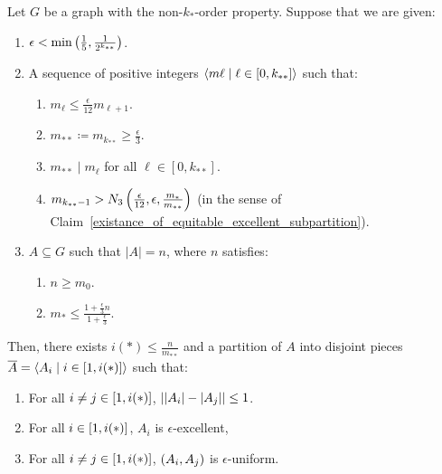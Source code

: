     \lemma[Corollary 5.15]\label{resume_of_all_conditions_for_excellent_partitions}
        Let $G$ be a graph with the non-$k_{*}$-order property.
        Suppose that we are given:
        \begin{enumerate}
            \item $\epsilon < \min \left( \frac{1}{5}, \frac{1}{2^{k_{**}}} \right)$.
            \item A sequence of positive integers $\left< m\ell \mid \ell \in [0, k_{**}] \right>$ such that:
            \begin{enumerate}[label=(\alph*), ref=2.\alph*]
                \item \label{itm:5.15.a} $m_\ell \leq \frac{\epsilon}{12} m_{\ell + 1}$.
                \item \label{itm:5.15.b} $m_{**} \coloneq m_{k_{**}} \geq \frac{\epsilon}{3}$.
                \item \label{itm:5.15.c} $m_{**} \mid m_\ell$ for all $\ell \in [0, k_{**}]$.
                \item \label{itm:5.15.d} $m_{k_{**}-1} > N_3\left( \frac{\epsilon}{12}, \epsilon, \frac{m_*}{m_{**}} \right)$ (in the sense
                    of Claim~\ref{existance_of_equitable_excellent_subpartition}).
            \end{enumerate}
            \item $A \subseteq G$ such that $|A| = n$, where $n$ satisfies:
            \begin{enumerate}[label=(\alph*'), ref=3.\alph*]
                \item \label{itm:5.15.a'} $n \geq m_0$.
                \item \label{itm:5.15.b'} $m_* \leq \frac{1 + \frac{\epsilon}{3}n}{1 + \frac{\epsilon}{3}}$.
            \end{enumerate}
        \end{enumerate}
        Then, there exists $i(*) \leq \frac{n}{m_{**}}$ and a partition of $A$ into disjoint pieces
        $\overline{A} = \left< A_i \mid i \in \left[ 1, i(*) \right] \right>$ such that:
        \begin{enumerate}[label=(\roman*), ref=\roman*]
            \item \label{itm:5.15.i} For all $i \neq j \in \left[ 1, i(*) \right]$, $\left| \left| A_i \right|- \left| A_j \right| \right| \leq 1$.
            \item \label{itm:5.15.ii} For all $i \in \left[ 1, i(*) \right]$, $A_i$ is $\epsilon$-excellent,
            \item \label{itm:5.15.iii} For all $i \neq j \in \left[ 1, i(*) \right]$, $\left( A_i, A_j \right)$ is $\epsilon$-uniform.
        \end{enumerate}
